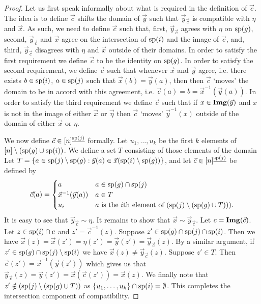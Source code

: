 \documentclass[../paper.tex]{subfiles}
\begin{document}
\begin{proof}
  Let us first speak informally about what is required in the definition of
  $\vec{c}$. The idea is to define $\vec{c}$ shifts the domain of $\vec{y}$ such
  that $\vec{y}_{\vec{c}}$ is compatible with $\eta$ and $\vec{x}$. As such, we
  need to define $\vec{c}$ such that, first, $\vec{y}_{\vec{c}}$ agrees with
  $\eta$ on $\text{sp}(g)$, second, $\vec{y}_{\vec{c}}$ and $\vec{x}$ agree on the
  intersection of $\text{sp}(i)$ and the image of $\vec{c}$, and, third,
  $\vec{y}_{\vec{c}}$ disagrees with $\eta$ and $\vec{x}$ outside of their
  domains. In order to satisfy the first requirement we define $\vec{c}$ to be
  the identity on $\text{sp}(g)$. In order to satisfy the second requirement, we
  define $\vec{c}$ such that whenever $\vec{x}$ and $\vec{y}$ agree, i.e. there
  exists $b \in \text{sp}(i)$, $a \in \text{sp}(j)$ such that $\vec{x}(b) =
  \vec{y}(a)$, then then $\vec{c}$ `moves' the domain to be in accord with this
  agreement, i.e. $\vec{c}(a) = b = \vec{x}^{-1}(\vec{y}(a))$. In order to
  satisfy the third requirement we define $\vec{c}$ such that if $x \in
  \text{\textbf{Img}}(\vec{y})$ and $x$ is not in the image of either $\vec{x}$ or $\vec{\eta}$
  then $\vec{c}$ `moves' $\vec{y}^{-1}(x)$ outside of the domain of either
  $\vec{x}$ or $\eta$.

  We now define $\vec{c} \in [n]^{\underline{\text{sp}(j)}}$ formally. Let $u_1,
  \ldots , u_k$ be the first $k$ elements of $[n] \setminus (\text{sp}(g) \cup
  \text{sp}(i))$. We define a set $T$ consisting of those elements of the domain
  Let $T = \{a \in \text{sp}(j) \setminus \text{sp}(g) : \vec{y}(a) \in
  \vec{x}(\text{sp}(i) \setminus \text{sp}(g))\}$, and let $\vec{c} \in
  [n]^{\underline{\text{sp}(j)}}$ be defined by
	\[
		\vec{c} (a) =
		\begin{cases}
			a                        & a \in \text{sp}(g) \cap \text{sp}(j)                                     \\
			\vec{x}^{-1}(\vec{y}(a)) & a \in T                                                            \\
			u_{i} & \text{$a$ is the $i$th element of $(\text{sp}(j) \setminus (\text{sp}(g)
        \cup T)))$}.
		\end{cases}
	\]
	It is easy to see that $\vec{y}_{\vec{c}} \sim \eta$. It remains to show that
  $\vec{x} \sim \vec{y}_{\vec{c}}$. Let $c = \text{\textbf{Img}}(\vec{c})$. Let $z \in
  \text{sp}(i) \cap c$ and $z' = \vec{c}^{-1}(z)$. Suppose $z' \in \text{sp}(g)\cap
  \text{sp}(j) \cap \text{sp}(i)$. Then we have $\vec{x}(z) = \vec{x}(z') = \eta (z')
  = \vec{y}(z') = \vec{y}_{\vec{c}}(z)$. By a similar argument, if $z' \in
  \text{sp}(g) \cap \text{sp}(j) \setminus \text{sp}(i)$ we have $\vec{x}(z) \neq
  \vec{y}_{\vec{c}}(z)$. Suppose $z' \in T$. Then $\vec{c}(z') =
  \vec{x}^{-1}(\vec{y}(z'))$ which gives us that $\vec{y}_{\vec{c}}(z) =
  \vec{y}(z') = \vec{x}(\vec{c}(z')) = \vec{x}(z)$. We finally note that $z'
  \notin (\text{sp}(j) \setminus (\text{sp}(g) \cup T))$ as $\{u_1 , \ldots , u_k\}
  \cap \text{sp}(i) = \emptyset$. This completes the intersection component of
  compatibility.
		

\end{proof}
\end{document}
